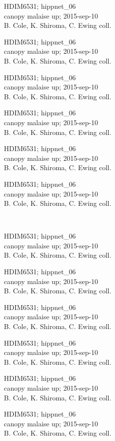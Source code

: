 \documentclass[2pt]{extarticle}
\begin{document}
\noindent
\parbox{0.16\textwidth}{\tiny \raggedright \rule[-0.3\baselineskip]{0pt}{10pt}HDIM6531; hippnet\_06\\ canopy malaise up; 2015-sep-10\\ B. Cole, K. Shiroma, C. Ewing coll.}
\parbox{0.16\textwidth}{\tiny \raggedright \rule[-0.3\baselineskip]{0pt}{10pt}HDIM6531; hippnet\_06\\ canopy malaise up; 2015-sep-10\\ B. Cole, K. Shiroma, C. Ewing coll.}
\parbox{0.16\textwidth}{\tiny \raggedright \rule[-0.3\baselineskip]{0pt}{10pt}HDIM6531; hippnet\_06\\ canopy malaise up; 2015-sep-10\\ B. Cole, K. Shiroma, C. Ewing coll.}
\parbox{0.16\textwidth}{\tiny \raggedright \rule[-0.3\baselineskip]{0pt}{10pt}HDIM6531; hippnet\_06\\ canopy malaise up; 2015-sep-10\\ B. Cole, K. Shiroma, C. Ewing coll.}
\parbox{0.16\textwidth}{\tiny \raggedright \rule[-0.3\baselineskip]{0pt}{10pt}HDIM6531; hippnet\_06\\ canopy malaise up; 2015-sep-10\\ B. Cole, K. Shiroma, C. Ewing coll.}
\parbox{0.16\textwidth}{\tiny \raggedright \rule[-0.3\baselineskip]{0pt}{10pt}HDIM6531; hippnet\_06\\ canopy malaise up; 2015-sep-10\\ B. Cole, K. Shiroma, C. Ewing coll.} \\ 
\vspace{0.001in} 

\noindent
\parbox{0.16\textwidth}{\tiny \raggedright \rule[-0.3\baselineskip]{0pt}{10pt}HDIM6531; hippnet\_06\\ canopy malaise up; 2015-sep-10\\ B. Cole, K. Shiroma, C. Ewing coll.}
\parbox{0.16\textwidth}{\tiny \raggedright \rule[-0.3\baselineskip]{0pt}{10pt}HDIM6531; hippnet\_06\\ canopy malaise up; 2015-sep-10\\ B. Cole, K. Shiroma, C. Ewing coll.}
\parbox{0.16\textwidth}{\tiny \raggedright \rule[-0.3\baselineskip]{0pt}{10pt}HDIM6531; hippnet\_06\\ canopy malaise up; 2015-sep-10\\ B. Cole, K. Shiroma, C. Ewing coll.}
\parbox{0.16\textwidth}{\tiny \raggedright \rule[-0.3\baselineskip]{0pt}{10pt}HDIM6531; hippnet\_06\\ canopy malaise up; 2015-sep-10\\ B. Cole, K. Shiroma, C. Ewing coll.}
\parbox{0.16\textwidth}{\tiny \raggedright \rule[-0.3\baselineskip]{0pt}{10pt}HDIM6531; hippnet\_06\\ canopy malaise up; 2015-sep-10\\ B. Cole, K. Shiroma, C. Ewing coll.}
\parbox{0.16\textwidth}{\tiny \raggedright \rule[-0.3\baselineskip]{0pt}{10pt}HDIM6531; hippnet\_06\\ canopy malaise up; 2015-sep-10\\ B. Cole, K. Shiroma, C. Ewing coll.} \\ 
\vspace{0.001in} 
\end{document}
